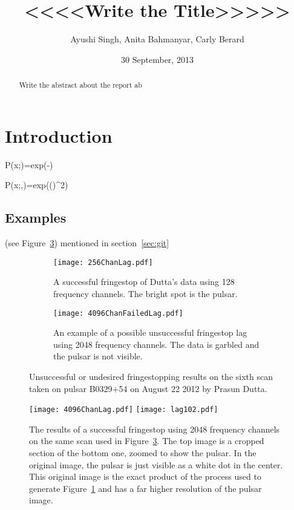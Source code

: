 \documentclass[a4paper,12pt]{article}
\begin{document}
\onehalfspacing
\title{<<<<Write the Title>>>>>}
\author{Ayushi Singh, Anita Bahmanyar, Carly Berard}
\date{30 September, 2013}
\maketitle

\begin{abstract}
Write the abstract about the report ab
\label{abstract}

\end{abstract}

\section{Introduction}
\label{sec:introduction}
P(x;\mu)=exp(-\mu)


P(x;\mu,\sigma)=exp(()^2)

\subsection{Examples}
\label{sec:ex}

(see Figure~\ref{fig:failedFS})
mentioned in section~\ref{sec:git}

\begin{figure}
\centering
\begin{subfigure}{0.5\textwidth}
  \centering
  \texttt{[image: 256ChanLag.pdf]}
  \caption{A successful fringestop of Dutta's data using 128 frequency channels. The bright spot is the pulsar.}
  \label{fig:sub1}
\end{subfigure}%
\begin{subfigure}{0.5\textwidth}
  \centering
  \texttt{[image: 4096ChanFailedLag.pdf]}
  \caption{An example of a possible unsuccessful fringestop lag using 2048 frequency channels. The data is garbled and the pulsar is not visible.}
  \label{fig:sub2}
\end{subfigure}
\caption{Unsuccessful or undesired fringestopping results on the sixth scan taken on pulsar B0329+54 on August 22 2012 by Prasun Dutta.}
\label{fig:failedFS}
\end{figure}

\begin{figure}
\centering
\texttt{[image: 4096ChanLag.pdf]}
\texttt{[image: lag102.pdf]}
\caption{The results of a successful fringestop using 2048 frequency channels on the same scan used in Figure~\ref{fig:failedFS}. The top image is a cropped section of the bottom one, zoomed to show the pulsar. In the original image, the pulsar is just visible as a white dot in the center. This original image is the exact product of the process used to generate Figure~\ref{fig:sub1} and has a far higher resolution of the pulsar image.}
\label{fig:successfulFS}
\end{figure}
\end{document}
